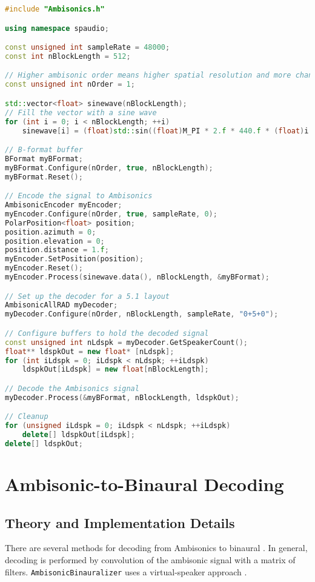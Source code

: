 \documentclass[12pt]{report}
\begin{document}
\begin{lstlisting}[language=C++]
#include "Ambisonics.h"

using namespace spaudio;

const unsigned int sampleRate = 48000;
const int nBlockLength = 512;

// Higher ambisonic order means higher spatial resolution and more channels required
const unsigned int nOrder = 1;

std::vector<float> sinewave(nBlockLength);
// Fill the vector with a sine wave
for (int i = 0; i < nBlockLength; ++i)
    sinewave[i] = (float)std::sin((float)M_PI * 2.f * 440.f * (float)i / (float)sampleRate);

// B-format buffer
BFormat myBFormat;
myBFormat.Configure(nOrder, true, nBlockLength);
myBFormat.Reset();

// Encode the signal to Ambisonics
AmbisonicEncoder myEncoder;
myEncoder.Configure(nOrder, true, sampleRate, 0);
PolarPosition<float> position;
position.azimuth = 0;
position.elevation = 0;
position.distance = 1.f;
myEncoder.SetPosition(position);
myEncoder.Reset();
myEncoder.Process(sinewave.data(), nBlockLength, &myBFormat);

// Set up the decoder for a 5.1 layout
AmbisonicAllRAD myDecoder;
myDecoder.Configure(nOrder, nBlockLength, sampleRate, "0+5+0");

// Configure buffers to hold the decoded signal
const unsigned int nLdspk = myDecoder.GetSpeakerCount();
float** ldspkOut = new float* [nLdspk];
for (int iLdspk = 0; iLdspk < nLdspk; ++iLdspk)
    ldspkOut[iLdspk] = new float[nBlockLength];

// Decode the Ambisonics signal
myDecoder.Process(&myBFormat, nBlockLength, ldspkOut);

// Cleanup
for (unsigned iLdspk = 0; iLdspk < nLdspk; ++iLdspk)
    delete[] ldspkOut[iLdspk];
delete[] ldspkOut;
\end{lstlisting}


\section{Ambisonic-to-Binaural Decoding}\label{AmbiToBin}

\subsection{Theory and Implementation Details}
There are several methods for decoding from Ambisonics to binaural \cite{Noisternig2003,schorkhuber2018binaural,Zaunschirm2018}.
In general, decoding is performed by convolution of the ambisonic signal with a matrix of filters.
\texttt{AmbisonicBinauralizer} uses a virtual-speaker approach \cite{Noisternig2003}.
\end{document}
